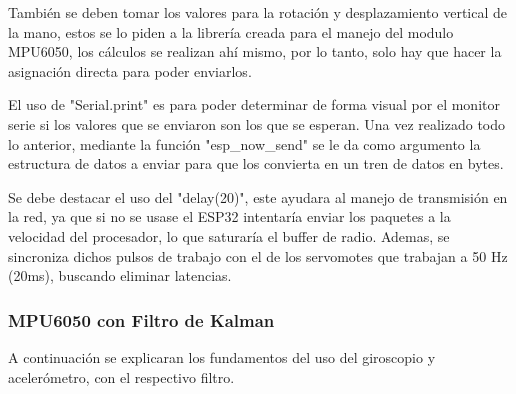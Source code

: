 \documentclass[10pt]{article}
\begin{document}
También se deben tomar los valores para la rotación y desplazamiento vertical de la mano, estos se lo piden a la librería creada para el manejo del modulo MPU6050, los cálculos se realizan ahí mismo, por lo tanto, solo hay que hacer la asignación directa para poder enviarlos. 

El uso de "Serial.print" es para poder determinar de forma visual por el monitor serie si los valores que se enviaron son los que se esperan. Una vez realizado todo lo anterior, mediante la función "esp\_now\_send" se le da como argumento la estructura de datos a enviar para que los convierta en un tren de datos en bytes. 

Se debe destacar el uso del "delay(20)", este ayudara al manejo de transmisión en la red, ya que si no se usase el ESP32 intentaría enviar los paquetes a la velocidad del procesador, lo que saturaría el buffer de radio. Ademas, se sincroniza dichos pulsos de trabajo con el de los servomotes que trabajan a 50 Hz (20ms), buscando eliminar latencias.  

\subsubsection{MPU6050 con Filtro de Kalman}

A continuación se explicaran los fundamentos del uso del giroscopio y acelerómetro, con el respectivo filtro. 
\end{document}
